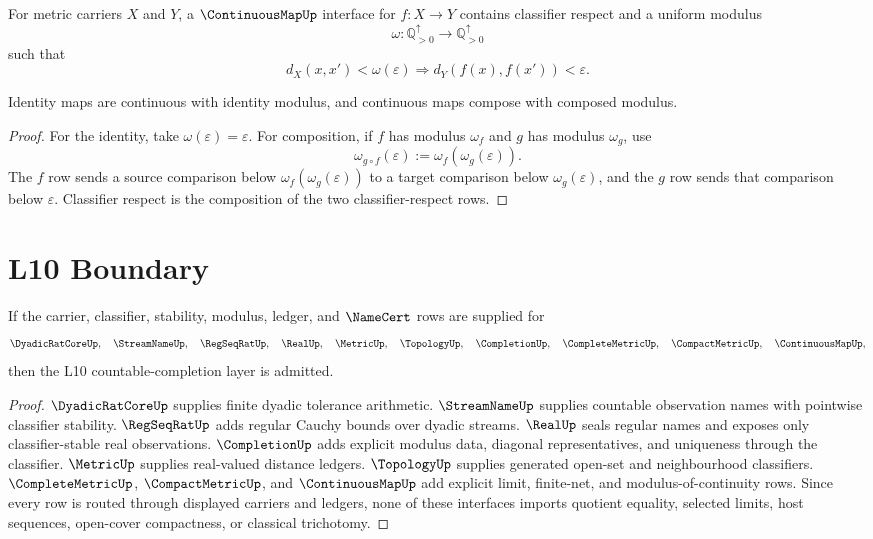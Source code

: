 \begin{definition}
\label{def:countable-completion-continuous-map}
For metric carriers $X$ and $Y$, a $\ContinuousMapUp$ interface for
$f:X\to Y$ contains classifier respect and a uniform modulus
$$
\omega:\mathbb Q_{>0}^{\uparrow}\to\mathbb Q_{>0}^{\uparrow}
$$
such that
$$
d_X(x,x')<\omega(\varepsilon)
\Longrightarrow
d_Y(f(x),f(x'))<\varepsilon.
$$
\end{definition}

\begin{theorem}
\label{thm:countable-completion-continuous-map-laws}
Identity maps are continuous with identity modulus, and continuous maps
compose with composed modulus.
\end{theorem}

\begin{proof}
For the identity, take $\omega(\varepsilon)=\varepsilon$.  For composition,
if $f$ has modulus $\omega_f$ and $g$ has modulus $\omega_g$, use
$$
\omega_{g\circ f}(\varepsilon):=\omega_f(\omega_g(\varepsilon)).
$$
The $f$ row sends a source comparison below $\omega_f(\omega_g(\varepsilon))$
to a target comparison below $\omega_g(\varepsilon)$, and the $g$ row sends
that comparison below $\varepsilon$.  Classifier respect is the composition
of the two classifier-respect rows.
\end{proof}

\section{L10 Boundary}
\label{sec:countable-completion-boundary}

\begin{theorem}
\label{thm:countable-completion-admission}
If the carrier, classifier, stability, modulus, ledger, and $\NameCert$ rows
are supplied for
$$
\DyadicRatCoreUp,\quad
\StreamNameUp,\quad
\RegSeqRatUp,\quad
\RealUp,\quad
\MetricUp,\quad
\TopologyUp,\quad
\CompletionUp,\quad
\CompleteMetricUp,\quad
\CompactMetricUp,\quad
\ContinuousMapUp,
$$
then the L10 countable-completion layer is admitted.
\end{theorem}

\begin{proof}
$\DyadicRatCoreUp$ supplies finite dyadic tolerance arithmetic.
$\StreamNameUp$ supplies countable observation names with pointwise
classifier stability.  $\RegSeqRatUp$ adds regular Cauchy bounds over dyadic
streams.  $\RealUp$ seals regular names and exposes only classifier-stable
real observations.  $\CompletionUp$ adds explicit modulus data, diagonal
representatives, and uniqueness through the classifier.  $\MetricUp$ supplies
real-valued distance ledgers.  $\TopologyUp$ supplies generated open-set and
neighbourhood classifiers.  $\CompleteMetricUp$, $\CompactMetricUp$, and
$\ContinuousMapUp$ add explicit limit, finite-net, and modulus-of-continuity
rows.  Since every row is routed through displayed carriers and ledgers, none
of these interfaces imports quotient equality, selected limits, host
sequences, open-cover compactness, or classical trichotomy.
\end{proof}

